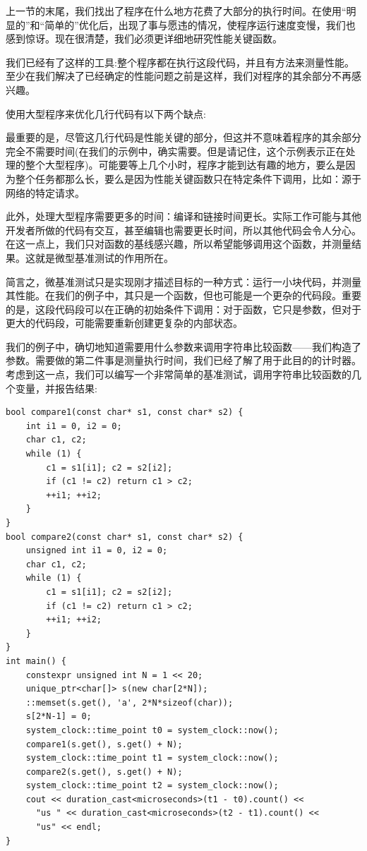 
上一节的末尾，我们找出了程序在什么地方花费了大部分的执行时间。在使用“明显的”和“简单的”优化后，出现了事与愿违的情况，使程序运行速度变慢，我们也感到惊讶。现在很清楚，我们必须更详细地研究性能关键函数。

我们已经有了这样的工具:整个程序都在执行这段代码，并且有方法来测量性能。至少在我们解决了已经确定的性能问题之前是这样，我们对程序的其余部分不再感兴趣。

使用大型程序来优化几行代码有以下两个缺点:

最重要的是，尽管这几行代码是性能关键的部分，但这并不意味着程序的其余部分完全不需要时间(在我们的示例中，确实需要。但是请记住，这个示例表示正在处理的整个大型程序)。可能要等上几个小时，程序才能到达有趣的地方，要么是因为整个任务都那么长，要么是因为性能关键函数只在特定条件下调用，比如：源于网络的特定请求。

此外，处理大型程序需要更多的时间：编译和链接时间更长。实际工作可能与其他开发者所做的代码有交互，甚至编辑也需要更长时间，所以其他代码会令人分心。在这一点上，我们只对函数的基线感兴趣，所以希望能够调用这个函数，并测量结果。这就是微型基准测试的作用所在。


简言之，微基准测试只是实现刚才描述目标的一种方式：运行一小块代码，并测量其性能。在我们的例子中，其只是一个函数，但也可能是一个更杂的代码段。重要的是，这段代码段可以在正确的初始条件下调用：对于函数，它只是参数，但对于更大的代码段，可能需要重新创建更复杂的内部状态。

我们的例子中，确切地知道需要用什么参数来调用字符串比较函数——我们构造了参数。需要做的第二件事是测量执行时间，我们已经了解了用于此目的的计时器。考虑到这一点，我们可以编写一个非常简单的基准测试，调用字符串比较函数的几个变量，并报告结果:

\begin{lstlisting}[style=styleCXX]
bool compare1(const char* s1, const char* s2) {
	int i1 = 0, i2 = 0;
	char c1, c2;
	while (1) {
		c1 = s1[i1]; c2 = s2[i2];
		if (c1 != c2) return c1 > c2;
		++i1; ++i2;
	}
}
bool compare2(const char* s1, const char* s2) {
	unsigned int i1 = 0, i2 = 0;
	char c1, c2;
	while (1) {
		c1 = s1[i1]; c2 = s2[i2];
		if (c1 != c2) return c1 > c2;
		++i1; ++i2;
	}
}
int main() {
	constexpr unsigned int N = 1 << 20;
	unique_ptr<char[]> s(new char[2*N]);
	::memset(s.get(), 'a', 2*N*sizeof(char));
	s[2*N-1] = 0;
	system_clock::time_point t0 = system_clock::now();
	compare1(s.get(), s.get() + N);
	system_clock::time_point t1 = system_clock::now();
	compare2(s.get(), s.get() + N);
	system_clock::time_point t2 = system_clock::now();
	cout << duration_cast<microseconds>(t1 - t0).count() <<
	  "us " << duration_cast<microseconds>(t2 - t1).count() <<
	  "us" << endl;
}
\end{lstlisting}

